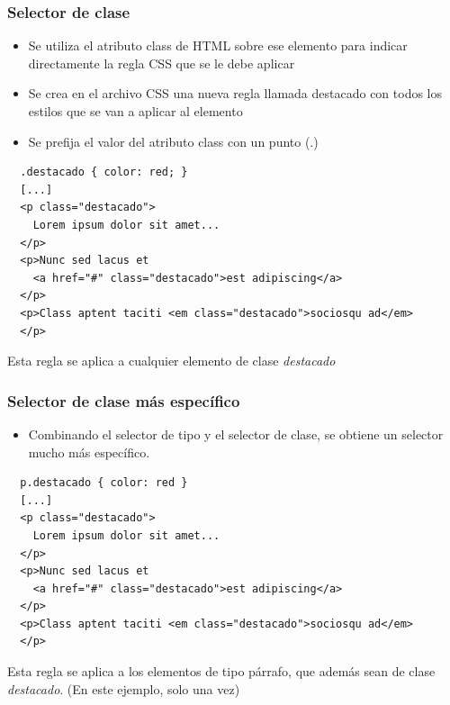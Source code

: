 \documentclass[ucs]{beamer}
\begin{document}
\begin{frame}[fragile]
\frametitle{Selector de clase}

\begin{itemize}
  \item Se utiliza el atributo class de HTML sobre ese elemento para indicar directamente la regla CSS que se le debe aplicar
  \item Se crea en el archivo CSS una nueva regla llamada destacado con todos los estilos que se van a aplicar al elemento
  \item Se prefija el valor del atributo class con un punto (.)
\end{itemize}


  \begin{footnotesize}
  \begin{verbatim}
  .destacado { color: red; }
  [...]
  <p class="destacado">
    Lorem ipsum dolor sit amet...
  </p>
  <p>Nunc sed lacus et
    <a href="#" class="destacado">est adipiscing</a>
  </p>
  <p>Class aptent taciti <em class="destacado">sociosqu ad</em>
  </p>
  \end{verbatim}
  \end{footnotesize}

Esta regla se aplica a cualquier elemento de clase \emph{destacado}



\end{frame}


\begin{frame}[fragile]
\frametitle{Selector de clase más específico}

\begin{itemize}
  \item Combinando el selector de tipo y el selector de clase, se obtiene un selector mucho más específico.
\end{itemize}

{\footnotesize
\begin{verbatim}
  p.destacado { color: red }
  [...]
  <p class="destacado">
    Lorem ipsum dolor sit amet...
  </p>
  <p>Nunc sed lacus et
    <a href="#" class="destacado">est adipiscing</a>
  </p>
  <p>Class aptent taciti <em class="destacado">sociosqu ad</em>
  </p>
\end{verbatim}
}

Esta regla se aplica a los elementos de tipo párrafo, que además sean
de clase \emph{destacado}. (En este ejemplo, solo una vez)
\end{frame}
\end{document}

